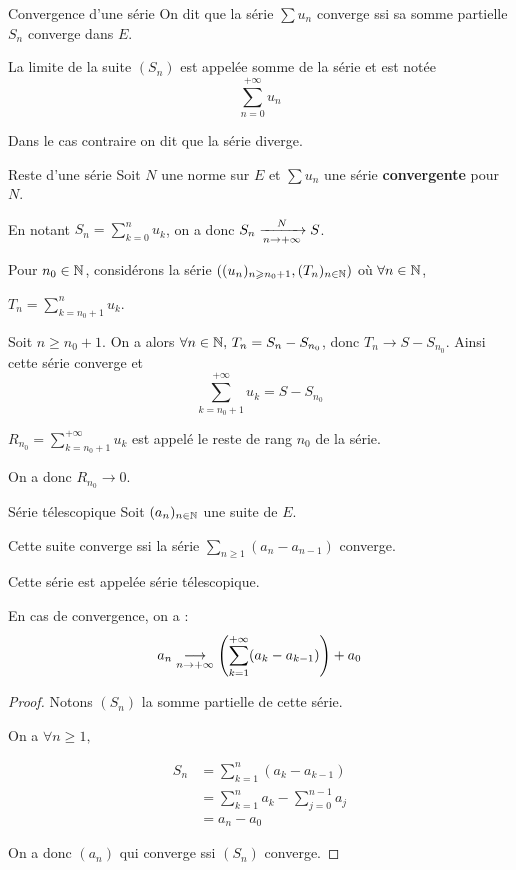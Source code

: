 \begin{definition}{Convergence d'une série}{}
    On dit que la série $\sum u_n$ converge ssi sa somme partielle $S_n$ converge 
    dans $E$. 

    La limite de la suite $(S_n)$ est appelée somme de la série et est notée 
    $$\sum_{n=0}^{+\infty} u_n$$

    Dans le cas contraire on dit que la série diverge.
\end{definition}


\begin{definition}{Reste d'une série}{}
    Soit $N$ une norme sur $E$ et $\sum u_n$ une série \textbf{convergente} pour $N$.

    En notant $S_n = \sum_{k=0}^n u_k$, on a donc $S_n \limitnorme{N}{n}{+ \infty} S$.

    Pour $n_0 \in \N$, considérons la série $((u_n)_{n \geqslant n_0 + 1}, (T_n)_{n \in \N})$ où
    $\displaystyle \forall n \in \N$, 
    
    $\displaystyle T_n = \sum_{k = n_0 + 1}^{n} u_k$. 

    Soit $n \geqslant n_0 + 1$. On a alors $\forall n \in \N, \, T_n = S_n - S_{n_0}$, 
    donc $T_n \longrightarrow S - S_{n_0}$. Ainsi cette série converge et 
    $$\sum_{k = n_0 + 1}^{+\infty} u_k = S - S_{n_0}$$

    $\displaystyle R_{n_0} = \sum_{k = n_0 + 1}^{+\infty} u_k$ est appelé le reste de rang $n_0$ de 
    la série. 

    On a donc $R_{n_0} \longrightarrow 0$.

\end{definition}

\begin{theoreme}{Série télescopique}{}
    Soit $(a_n)_{n \in \N}$ une suite de $E$. 

    Cette suite converge ssi la série $\sum_{n \geqslant 1} (a_n - a_{n-1})$ converge.

    Cette série est appelée série télescopique. 

    En cas de convergence, on a : 
    $$a_n \limit{n}{+ \infty} \left( \sum_{k = 1 }^{+ \infty } (a_k - a_{k-1}) \right) + a_0$$
\end{theoreme}

\begin{proof}
    Notons $(S_n)$ la somme partielle de cette série. 

    On a $\forall n \geqslant 1, $

    \begin{align*}
        S_n & = \sum_{k=1}^n (a_k - a_{k-1}) \\
            & = \sum_{k=1}^n a_k - \sum_{j=0}^{n-1} a_j \\
            & = a_n - a_0
    \end{align*}

    On a donc $(a_n)$ qui converge ssi $(S_n)$ converge.
\end{proof}

